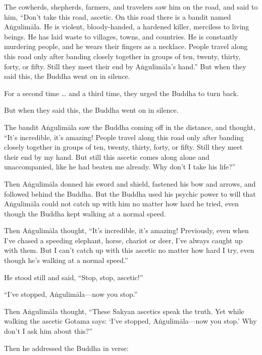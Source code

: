 \documentclass[12pt,openany]{book}%
\begin{document}
The cowherds, shepherds, farmers, and travelers saw him on the road, and said to him, “Don’t take this road, ascetic. On this road there is a bandit named \textsanskrit{Aṅgulimāla}. He is violent, bloody-handed, a hardened killer, merciless to living beings. He has laid waste to villages, towns, and countries. He is constantly murdering people, and he wears their fingers as a necklace. People travel along this road only after banding closely together in groups of ten, twenty, thirty, forty, or fifty. Still they meet their end by \textsanskrit{Aṅgulimāla}’s hand.” But when they said this, the Buddha went on in silence. 

For a second time … and a third time, they urged the Buddha to turn back. 

But when they said this, the Buddha went on in silence. 

The bandit \textsanskrit{Aṅgulimāla} saw the Buddha coming off in the distance, and thought, “It’s incredible, it’s amazing! People travel along this road only after banding closely together in groups of ten, twenty, thirty, forty, or fifty. Still they meet their end by my hand. But still this ascetic comes along alone and unaccompanied, like he had beaten me already. Why don’t I take his life?” 

Then \textsanskrit{Aṅgulimāla} donned his sword and shield, fastened his bow and arrows, and followed behind the Buddha. But the Buddha used his psychic power to will that \textsanskrit{Aṅgulimāla} could not catch up with him no matter how hard he tried, even though the Buddha kept walking at a normal speed. 

Then \textsanskrit{Aṅgulimāla} thought, “It’s incredible, it’s amazing! Previously, even when I’ve chased a speeding elephant, horse, chariot or deer, I’ve always caught up with them. But I can’t catch up with this ascetic no matter how hard I try, even though he’s walking at a normal speed.” 

He stood still and said, “Stop, stop, ascetic!” 

“I’ve stopped, \textsanskrit{Aṅgulimāla}—now you stop.” 

Then \textsanskrit{Aṅgulimāla} thought, “These Sakyan ascetics speak the truth. Yet while walking the ascetic Gotama says: ‘I’ve stopped, \textsanskrit{Aṅgulimāla}—now you stop.’ Why don’t I ask him about this?” 

Then he addressed the Buddha in verse: 
\end{document}
